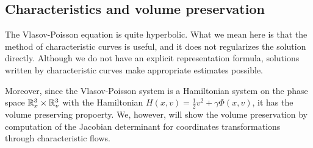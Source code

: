 \documentclass[11pt]{amsart}
\begin{document}
\subsection{Characteristics and volume preservation}

The Vlasov-Poisson equation is quite hyperbolic.
What we mean here is that the method of characteristic curves is useful, and it does not regularizes the solution directly.
Although we do not have an explicit representation formula, solutions written by characteristic curves make appropriate estimates possible.

Moreover, since the Vlasov-Poisson system is a Hamiltonian system on the phase space $\mathbb{R}_x^3\times\mathbb{R}_v^3$ with the Hamiltonian $H(x,v)=\frac12v^2+\gamma\Phi(x,v)$, it has the volume preserving propoerty.
We, however, will show the volume preservation by computation of the Jacobian determinant for coordinates transformations through characteristic flows.
\end{document}
